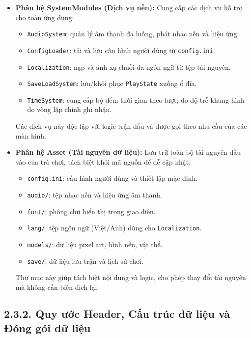 \begin{itemize}
    \item \textbf{Phân hệ SystemModules (Dịch vụ nền):}
    Cung cấp các dịch vụ hỗ trợ cho toàn ứng dụng:
    \begin{itemize}
        \item \texttt{AudioSystem}: quản lý âm thanh đa luồng, phát nhạc nền và hiệu ứng.
        \item \texttt{ConfigLoader}: tải và lưu cấu hình người dùng từ \texttt{config.ini}.
        \item \texttt{Localization}: nạp và ánh xạ chuỗi đa ngôn ngữ từ tệp tài nguyên.
        \item \texttt{SaveLoadSystem}: lưu/khôi phục \texttt{PlayState} xuống ổ đĩa.
        \item \texttt{TimeSystem}: cung cấp bộ đếm thời gian theo lượt; đo độ trễ khung hình do vòng lặp chính ghi nhận.
    \end{itemize}
    Các dịch vụ này độc lập với logic trận đấu và được gọi theo nhu cầu của các màn hình.

    \item \textbf{Phân hệ Asset (Tài nguyên dữ liệu):}
    Lưu trữ toàn bộ tài nguyên đầu vào của trò chơi, tách biệt khỏi mã nguồn để dễ cập nhật:
    \begin{itemize}
        \item \texttt{config.ini}: cấu hình người dùng và thiết lập mặc định.
        \item \texttt{audio/}: tệp nhạc nền và hiệu ứng âm thanh.
        \item \texttt{font/}: phông chữ hiển thị trong giao diện.
        \item \texttt{lang/}: tệp ngôn ngữ (Việt/Anh) dùng cho \texttt{Localization}.
        \item \texttt{models/}: dữ liệu pixel art, hình nền, vật thể.
        \item \texttt{save/}: dữ liệu lưu trận và lịch sử chơi.
    \end{itemize}
    Thư mục này giúp tách biệt nội dung và logic, cho phép thay đổi tài nguyên mà không cần biên dịch lại.
\end{itemize}

\subsection*{2.3.2. Quy ước Header, Cấu trúc dữ liệu và Đóng gói dữ liệu}

